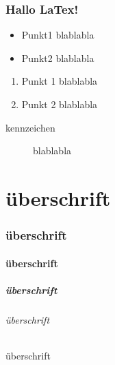 \documentclass[a4paper]{article}
\begin{document}
\section{Hallo LaTex!}


\vspace{2cm}


\begin{itemize}
\item
Punkt1 blablabla
\item
Punkt2 blablabla
\end{itemize}

\begin{enumerate}
\item
Punkt 1 blablabla
\item
Punkt 2 blablabla
\end{enumerate}

\begin{description}
\item[kennzeichen]
blablabla
\end{description}

\part{überschrift}
\section{überschrift}
\subsection{überschrift}
\subsubsection{überschrift}
\paragraph{überschrift}
\subparagraph{überschrift}
\end{document}
